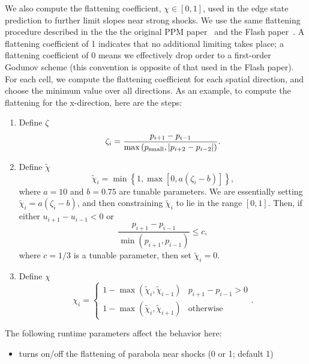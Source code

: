 We also compute the flattening coefficient, $\chi\in[0,1]$, used in
the edge state prediction to further limit slopes near strong shocks.
We use the same flattening procedure described in the the the original
PPM paper~\cite{ppm} and the Flash paper~\cite{flash}.
A flattening coefficient of 1 indicates that no additional limiting
takes place; a flattening coefficient of 0 means we effectively drop
order to a first-order Godunov scheme (this convention is opposite of
that used in the Flash paper).  For each cell, we compute the
flattening coefficient for each spatial direction, and choose the
minimum value over all directions.  As an example, to compute the
flattening for the x-direction, here are the steps:
\begin{enumerate}
\item Define $\zeta$
\begin{equation}
\zeta_i = \frac{p_{i+1}-p_{i-1}}{\max\left(p_{\rm small},|p_{i+2}-p_{i-2}|\right)}.
\end{equation}
\item Define $\tilde\chi$
\begin{equation}
\tilde\chi_i = \min\left\{1,\max[0,a(\zeta_i - b)]\right\},
\end{equation}
where $a=10$ and $b=0.75$ are tunable parameters.  We are essentially
setting $\tilde\chi_i=a(\zeta_i-b)$, and then constraining
$\tilde\chi_i$ to lie in the range $[0,1]$.  Then, if either
$u_{i+1}-u_{i-1}<0$ or
\begin{equation}
\frac{p_{i+1}-p_{i-1}}{\min(p_{i+1},p_{i-1})} \le c,
\end{equation}
where $c=1/3$ is a tunable parameter, then set $\tilde\chi_i=0$.
\item Define $\chi$
\begin{equation}
\chi_i =
\begin{cases}
1 - \max(\tilde\chi_i,\tilde\chi_{i-1}) & p_{i+1}-p_{i-1} > 0 \\
1 - \max(\tilde\chi_i,\tilde\chi_{i+1}) & \text{otherwise}
\end{cases}.
\end{equation}
\end{enumerate}

The following runtime parameters affect the behavior here:
\begin{itemize}
  \item {} turns on/off the flattening of parabola
  near shocks (0 or 1; default 1)
\end{itemize}


